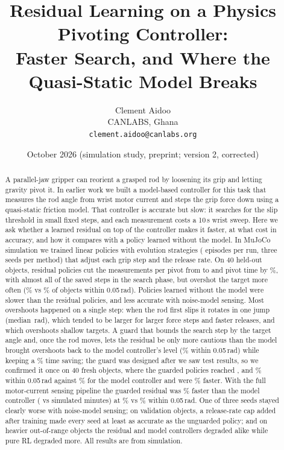 \documentclass[11pt]{article}
\title{Residual Learning on a Physics Pivoting Controller:\\ Faster Search, and Where the Quasi-Static Model Breaks}
\author{Clement Aidoo\\ CANLABS, Ghana\\ \texttt{clement.aidoo@canlabs.org}}
\date{October 2026 \quad (simulation study, preprint; version 2, corrected)}
\begin{document}
\maketitle

\begin{abstract}
A parallel-jaw gripper can reorient a grasped rod by loosening its grip and letting gravity pivot it. In earlier work we built a model-based controller for this task that measures the rod angle from wrist motor current and steps the grip force down using a quasi-static friction model. That controller is accurate but slow: it searches for the slip threshold in small fixed steps, and each measurement costs a 10\,s wrist sweep. Here we ask whether a learned residual on top of the controller makes it faster, at what cost in accuracy, and how it compares with a policy learned without the model. In MuJoCo simulation we trained linear policies with evolution strategies (\EpPerRun{} episodes per run, three seeds per method) that adjust each grip step and the release rate. On 40 held-out objects, residual policies cut the measurements per pivot from \IModProbes{} to \IResProbes{} and pivot time by \IResTimeCut\%, with almost all of the saved steps in the search phase, but overshot the target more often (\IResFive\% vs \IModFive\% of objects within 0.05\,rad). Policies learned without the model were slower than the residual policies, and less accurate with noise-model sensing. Most overshoots happened on a single step: when the rod first slips it rotates in one jump (median \FsRot{}\,rad), which tended to be larger for larger force steps and faster releases, and which overshoots shallow targets. A guard that bounds the search step by the target angle and, once the rod moves, lets the residual be only more cautious than the model brought overshoots back to the model controller's level (\IResGFive\% within 0.05\,rad) while keeping a \IResGTimeCut\% time saving; the guard was designed after we saw test results, so we confirmed it once on 40 fresh objects, where the guarded policies reached \KResGFivea, \KResGFiveb{} and \KResGFivec\% within 0.05\,rad against \KModFive\% for the model controller and were \KResGTimeCut\% faster. With the full motor-current sensing pipeline the guarded residual was \CResGTimeCut\% faster than the model controller (\CResGTime{} vs \CModTime{} simulated minutes) at \CResGFive\% vs \CModFive\% within 0.05\,rad. One of three seeds stayed clearly worse with noise-model sensing; on validation objects, a release-rate cap added after training made every seed at least as accurate as the unguarded policy; and on heavier out-of-range objects the residual and model controllers degraded alike while pure RL degraded more. All results are from simulation.
\end{abstract}
\end{document}
